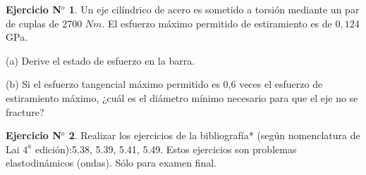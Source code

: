 \documentclass[12pt,a4paper]{article}
\theoremstyle{definition}
\newtheorem{theorem}{Ejercicio N$^o$}
\begin{document}

\begin{theorem}

Un eje cilíndrico de acero es sometido a torsión mediante un par de cuplas de 2700 $Nm$. El esfuerzo máximo permitido de estiramiento es de $0,124$ GPa.

(a) Derive el estado de esfuerzo en la barra.

(b) Si el esfuerzo tangencial máximo permitido es 0,6 veces el esfuerzo de estiramiento máximo, ¿cuál es el diámetro mínimo necesario para que el eje no se fracture?


\end{theorem} 

\begin{theorem}

Realizar los ejercicios de la bibliografía*  (seg\'un nomenclatura de Lai $4^{a}$ edición):5.38, 5.39, 5.41, 5.49.
Estos ejercicios son problemas elastodinámicos (ondas). Sólo para examen final.

\end{theorem}
\end{document}
